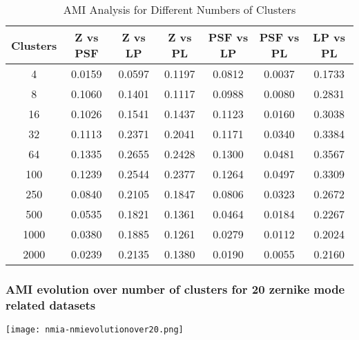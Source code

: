 \begin{table}[h!]
\centering
\begin{tabular}{|c|c|c|c|c|c|c|}
\hline
\textbf{Clusters} & \textbf{Z vs PSF} & \textbf{Z vs LP} & \textbf{Z vs PL} & \textbf{PSF vs LP} & \textbf{PSF vs PL} & \textbf{LP vs PL} \\
\hline
4 & 0.0159 & 0.0597 & 0.1197 & 0.0812 & 0.0037 & 0.1733 \\
8 & 0.1060 & 0.1401 & 0.1117 & 0.0988 & 0.0080 & 0.2831 \\
16 & 0.1026 & 0.1541 & 0.1437 & 0.1123 & 0.0160 & 0.3038 \\
32 & 0.1113 & 0.2371 & 0.2041 & 0.1171 & 0.0340 & 0.3384 \\
64 & 0.1335 & 0.2655 & 0.2428 & 0.1300 & 0.0481 & 0.3567 \\
100 & 0.1239 & 0.2544 & 0.2377 & 0.1264 & 0.0497 & 0.3309 \\
250 & 0.0840 & 0.2105 & 0.1847 & 0.0806 & 0.0323 & 0.2672 \\
500 & 0.0535 & 0.1821 & 0.1361 & 0.0464 & 0.0184 & 0.2267 \\
1000 & 0.0380 & 0.1885 & 0.1261 & 0.0279 & 0.0112 & 0.2024 \\
2000 & 0.0239 & 0.2135 & 0.1380 & 0.0190 & 0.0055 & 0.2160 \\
\hline
\end{tabular}
\caption{AMI Analysis for Different Numbers of Clusters}
\end{table}
		\FloatBarrier
		
	\subsubsection{AMI evolution over number of clusters for 20 zernike mode related datasets}
		\begin{figure*}[ht!]
			\centering
			\texttt{[image: nmia-nmievolutionover20.png]}
		\end{figure*}
		
